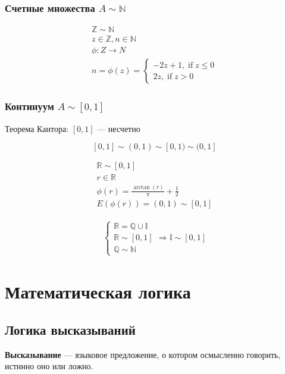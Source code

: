 \documentclass{article}
\DeclareMathOperator*{\If}{if}
\begin{document}
\subsubsection{Счетные множества $A \sim \mathbb{N}$}

\begin{gather*}
	\mathbb{Z} \sim \mathbb{N} \\
	z \in \mathbb{Z}, n \in \mathbb{N} \\
	\phi : Z \to N \\
	n = \phi(z) = \begin{cases}
		-2z + 1, \If z \le 0 \\
		2z, \If z > 0
	\end{cases}
\end{gather*}

\subsubsection{Континуум $A \sim [0, 1]$}

Теорема Кантора: $[0, 1]$ --- несчетно

\[ [0, 1] \sim (0, 1) \sim [0, 1) \sim (0, 1] \]

\begin{gather*}
	\mathbb{R} \sim [0, 1] \\
	r \in \mathbb{R} \\
	\phi(r) = \frac{\arctan(r)}{\pi} + \frac{1}{2} \\
	E(\phi(r)) = (0, 1) \sim [0, 1]
\end{gather*}

\begin{gather*}
	\begin{cases}
		\mathbb{R} = \mathbb{Q} \cup \mathbb{I} \\
		\mathbb{R} \sim [0, 1] \\
		\mathbb{Q} \sim \mathbb{N}
	\end{cases}
	\Rightarrow \mathbb{I} \sim [0, 1]
\end{gather*}

\section{Математическая логика}

\subsection{Логика высказываний}

\textbf{Высказывание} --- языковое предложение, о котором осмысленно говорить, истинно оно или ложно.
\end{document}
